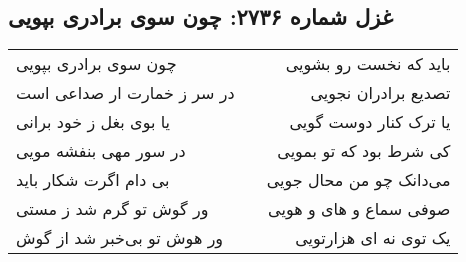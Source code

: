 \begin{center}
\section*{غزل شماره ۲۷۳۶: چون سوی برادری بپویی}
\label{sec:2736}
\begin{longtable}{l p{0.5cm} r}
چون سوی برادری بپویی
&&
باید که نخست رو بشویی
\\
در سر ز خمارت ار صداعی است
&&
تصدیع برادران نجویی
\\
یا بوی بغل ز خود برانی
&&
یا ترک کنار دوست گویی
\\
در سور مهی بنفشه مویی
&&
کی شرط بود که تو بمویی
\\
بی دام اگرت شکار باید
&&
می‌دانک چو من محال جویی
\\
ور گوش تو گرم شد ز مستی
&&
صوفی سماع و های و هویی
\\
ور هوش تو بی‌خبر شد از گوش
&&
یک توی نه ای هزارتویی
\\
\end{longtable}
\end{center}
